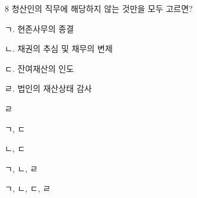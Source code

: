 \begin{question}{8}
청산인의 직무에 해당하지 않는 것만을 모두 고르면?
\begin{framedtext}
ㄱ. 현존사무의 종결 \par
ㄴ. 채권의 추심 및 채무의 변제 \par
ㄷ. 잔여재산의 인도 \par
ㄹ. 법인의 재산상태 감사
\end{framedtext}
\begin{choices}
  \item ㄹ
  \item ㄱ, ㄷ
  \item ㄴ, ㄷ
  \item ㄱ, ㄴ, ㄹ
  \item ㄱ, ㄴ, ㄷ, ㄹ
\end{choices}
\end{question}
